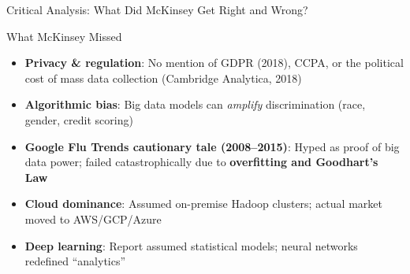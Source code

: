 \documentclass[aspectratio=169,10pt]{beamer}
\begin{document}
\begin{frame}{Critical Analysis: What Did McKinsey Get Right and Wrong?}
   
      \begin{alertblock}{What McKinsey Missed \texttimes}
        \begin{itemize}
          \item \textbf{Privacy \& regulation}: No mention of GDPR (2018), CCPA, or the political cost of mass data collection (Cambridge Analytica, 2018)
          \item \textbf{Algorithmic bias}: Big data models can \emph{amplify} discrimination (race, gender, credit scoring)
          \item \textbf{Google Flu Trends cautionary tale (2008--2015)}: Hyped as proof of big data power; failed catastrophically due to \textbf{overfitting and Goodhart's Law}
          \item \textbf{Cloud dominance}: Assumed on-premise Hadoop clusters; actual market moved to AWS/GCP/Azure
          \item \textbf{Deep learning}: Report assumed statistical models; neural networks redefined ``analytics''
        \end{itemize}
      \end{alertblock}
   
\end{frame}
\end{document}
